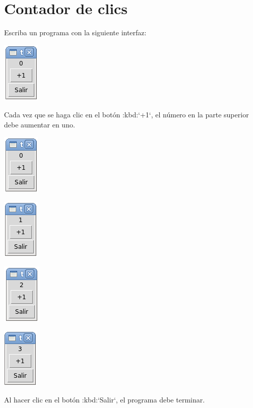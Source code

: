 \section{Contador de clics}

Escriba un programa con la siguiente interfaz:

\includegraphics{../../diapos/programas/tkinter/capturas/06-0.png}

Cada vez que se haga clic en el botón :kbd:`+1`, el número en la parte
superior debe aumentar en uno.

\includegraphics{../../diapos/programas/tkinter/capturas/06-0.png}

\includegraphics{../../diapos/programas/tkinter/capturas/06-1.png}

\includegraphics{../../diapos/programas/tkinter/capturas/06-2.png}

\includegraphics{../../diapos/programas/tkinter/capturas/06-3.png}

Al hacer clic en el botón :kbd:`Salir`, el programa debe terminar.
